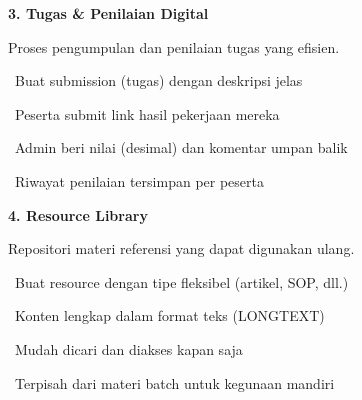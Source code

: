 \documentclass[a4paper]{article}
\begin{document}
\vspace{8pt}

\noindent
\begin{minipage}[t]{0.485\textwidth}
    \colorbox{EmeraldPrimary}{%
        \begin{minipage}{\dimexpr\textwidth-2\fboxsep\relax}
            {\fontsize{10}{13}\selectfont\bfseries\color{White} 3. Tugas \& Penilaian Digital}
        \end{minipage}}\par
    \vspace{4pt}
    {\fontsize{9}{12}\selectfont\color{TextDark}%
    Proses pengumpulan dan penilaian tugas yang efisien.\par\vspace{3pt}
    \textbullet\ Buat submission (tugas) dengan deskripsi jelas\par\vspace{2pt}%
    \textbullet\ Peserta submit link hasil pekerjaan mereka\par\vspace{2pt}%
    \textbullet\ Admin beri nilai (desimal) dan komentar umpan balik\par\vspace{2pt}%
    \textbullet\ Riwayat penilaian tersimpan per peserta}%
\end{minipage}%
\hfill
\begin{minipage}[t]{0.485\textwidth}
    \colorbox{PurplePrimary}{%
        \begin{minipage}{\dimexpr\textwidth-2\fboxsep\relax}
            {\fontsize{10}{13}\selectfont\bfseries\color{White} 4. Resource Library}
        \end{minipage}}\par
    \vspace{4pt}
    {\fontsize{9}{12}\selectfont\color{TextDark}%
    Repositori materi referensi yang dapat digunakan ulang.\par\vspace{3pt}
    \textbullet\ Buat resource dengan tipe fleksibel (artikel, SOP, dll.)\par\vspace{2pt}%
    \textbullet\ Konten lengkap dalam format teks (LONGTEXT)\par\vspace{2pt}%
    \textbullet\ Mudah dicari dan diakses kapan saja\par\vspace{2pt}%
    \textbullet\ Terpisah dari materi batch untuk kegunaan mandiri}%
\end{minipage}
\end{document}
